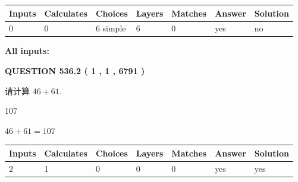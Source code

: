 \documentclass{ctexart}
\begin{document}
   
\noindent\begin{tabular}{|l|l|l|l|l|l|l|}
 \hline
Inputs & Calculates & Choices & Layers & Matches & Answer & Solution \\ \hline
 0  & 
 0  & 
 6
  simple  
  & 
 6  & 
 0  & 
  yes & 
  no 
  \\ \hline
 \end{tabular}
   
   
   
   
\noindent{}
   
   
   
   
\noindent\vspace{0.1in}\hspace{-0.08in} {\textbf{\Large{All inputs: }}}
   
   
  
\vspace{0.2in}
  
{\textbf{\Large{QUESTION
536.2 
 ( 1 , 1 , 6791 )
}}}
  
  
 
请计算 $ %
46 +  %
61 $.
 
 
 
\noindent{}
 
 

107
 
 
\noindent{}
 
 

 
 
 
\noindent{}
 
 

$ %
46 +  %
61=   %
107$
 
 
\noindent{}
 
 

 
   
   
   
   
\noindent\begin{tabular}{|l|l|l|l|l|l|l|}
 \hline
Inputs & Calculates & Choices & Layers & Matches & Answer & Solution \\ \hline
 2  & 
 1  & 
 0
  & 
 0  & 
 0  & 
  yes & 
  yes 
  \\ \hline
 \end{tabular}
   
\end{document}
